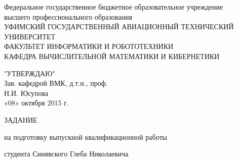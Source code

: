 \newpage

\begin{center}
Федеральное государственное бюджетное образовательное учреждение\\
высшего профессионального образования \\
\vspace{0.5cm}
УФИМСКИЙ ГОСУДАРСТВЕННЫЙ АВИАЦИОННЫЙ ТЕХНИЧЕСКИЙ УНИВЕРСИТЕТ\\
\vspace{0.5cm}
ФАКУЛЬТЕТ  ИНФОРМАТИКИ  И  РОБОТОТЕХНИКИ \\
\vspace{0.5cm}
КАФЕДРА  ВЫЧИСЛИТЕЛЬНОЙ  МАТЕМАТИКИ  И  КИБЕРНЕТИКИ\\
\vspace{1cm}
\end{center}
\vspace{0.5cm}
\begin{flushright}
"УТВЕРЖДАЮ" \\
Зав. кафедрой  ВМК, д.т.н., проф.\\
\vspace{0.5cm}
\underline{\hspace{5cm}} Н.И. Юсупова\\
«08»    октября  2015  г.
\end{flushright}
\vspace{1cm}

\begin{center}
  \Large{ ЗАДАНИЕ }
\vspace{0.5cm}

на подготовку выпускной квалификационной работы
\end{center}

студента Синявского Глеба Николаевича

